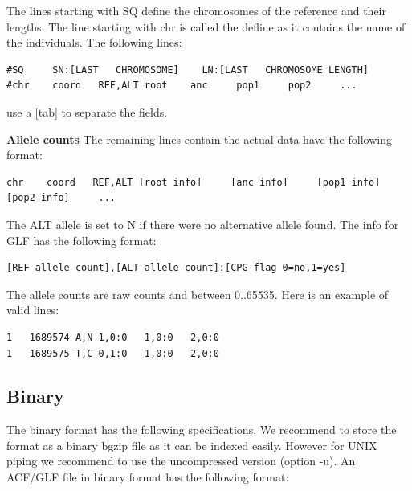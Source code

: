 \documentclass[a4paper]{article}
\begin{document}
\noindent The lines starting with  SQ define the chromosomes of the reference and their lengths. The line starting with chr is called the defline as it contains the name of the individuals. The following lines:


\begin{lstlisting}
#SQ     SN:[LAST   CHROMOSOME]    LN:[LAST   CHROMOSOME LENGTH]
#chr    coord   REF,ALT root    anc     pop1     pop2     ...
\end{lstlisting}

\noindent use a [tab] to separate the fields. 

\noindent \textbf{Allele counts}
\noindent The remaining lines contain the actual data have the following format:

\begin{lstlisting}
chr    coord   REF,ALT [root info]     [anc info]     [pop1 info]     [pop2 info]     ...
\end{lstlisting}

\noindent  The ALT allele is set to N if there were no alternative allele found. The info for GLF has the following format:

\begin{lstlisting}
[REF allele count],[ALT allele count]:[CPG flag 0=no,1=yes]
\end{lstlisting}

\noindent  The allele counts are raw counts and between 0..65535. Here is an example of valid lines:

\begin{lstlisting}
1	1689574	A,N	1,0:0	1,0:0	2,0:0
1	1689575	T,C	0,1:0	1,0:0	2,0:0
\end{lstlisting}



\subsection{Binary}


\noindent The binary format has the following specifications. We recommend to store the format as a binary bgzip file as it can be indexed easily. However for UNIX piping we recommend to use the uncompressed version (option -u). An ACF/GLF file in binary format has the following format:
\end{document}

